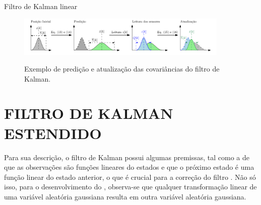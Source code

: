 \documentclass[acronym, symbols, table, deposito]{fei}
\begin{document}

				\begin{algorithm}
					\caption{Filtro de Kalman linear}\label{alg:kf_algoritmo}
				\end{algorithm}
			
				\begin{figure}[!htb]
					\centering
					\caption{Exemplo de predição e atualização das covariâncias do filtro de Kalman.}
					\includegraphics[width=0.9\textwidth]{exemplo_filtro_de_kalman.png}
					\label{fig:exemplo_filtro_de_kalman_covariancias}
				\end{figure}
		
		\section{FILTRO DE KALMAN ESTENDIDO}
			
			Para sua descrição, o filtro de Kalman possui algumas premissas, tal como a de que as observações são funções lineares do estados e que o próximo estado é uma função linear do estado anterior, o que é crucial para a correção do filtro \cite{thrun2002probabilistic}. Não só isso, para o desenvolvimento do , observa-se que qualquer transformação linear de uma variável aleatória gaussiana resulta em outra variável aleatória gaussiana. 
			
\end{document}
